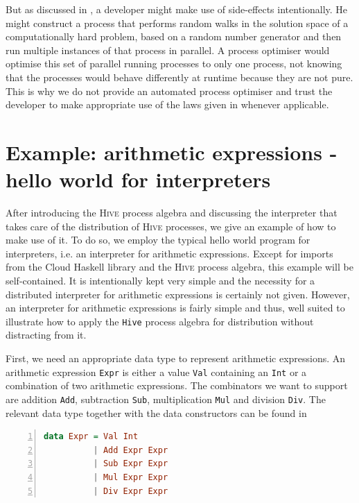 But as discussed in , a developer might make use of side-effects intentionally. He might construct a process that performs random walks in the solution space of a computationally hard problem, based on a random number generator and then run multiple instances of that process in parallel. A process optimiser would optimise this set of parallel running processes to only one process, not knowing that the processes would behave differently at runtime because they are not pure. This is why we do not provide an automated process optimiser and trust the developer to make appropriate use of the laws given in  whenever applicable.

\section{Example: arithmetic expressions - hello world for interpreters}
\label{chp:example}
After introducing the \textsc{Hive} process algebra and discussing the interpreter that takes care of the distribution of \textsc{Hive} processes, we give an example of how to make use of it. To do so, we employ the typical hello world program for interpreters, i.e. an interpreter for arithmetic expressions. Except for imports from the \textsf{Cloud Haskell} library and the \textsc{Hive} process algebra, this example will be self-contained. It is intentionally kept very simple and the necessity for a distributed interpreter for arithmetic expressions is certainly not given. However, an interpreter for arithmetic expressions is fairly simple and thus, well suited to illustrate how to apply the \texttt{Hive} process algebra for distribution without distracting from it.

First, we need an appropriate data type to represent arithmetic expressions. An arithmetic expression \texttt{Expr} is either a value \texttt{Val} containing an \texttt{Int} or a combination of two arithmetic expressions. The combinators we want to support are addition \texttt{Add}, subtraction \texttt{Sub}, multiplication \texttt{Mul} and division \texttt{Div}. The relevant data type together with the data constructors can be found in  
\begin{lstlisting}[language=Haskell, caption=Data model for the representation of arithmetic expressions., label=lst:arith_model, numbers=left, frame=bt]
data Expr = Val Int
          | Add Expr Expr
          | Sub Expr Expr
          | Mul Expr Expr
          | Div Expr Expr
\end{lstlisting}

